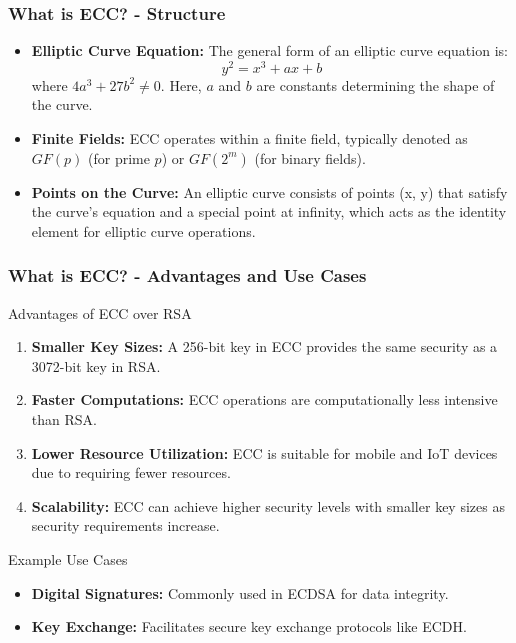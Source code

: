 \documentclass{beamer}
\begin{document}
\begin{frame}[fragile]
    \frametitle{What is ECC? - Structure}
    \begin{itemize}
        \item \textbf{Elliptic Curve Equation:} The general form of an elliptic curve equation is:
        \[
        y^2 = x^3 + ax + b
        \]
        where \(4a^3 + 27b^2 \neq 0\). Here, \(a\) and \(b\) are constants determining the shape of the curve.
        
        \item \textbf{Finite Fields:} ECC operates within a finite field, typically denoted as \(GF(p)\) (for prime \(p\)) or \(GF(2^m)\) (for binary fields).
        
        \item \textbf{Points on the Curve:} An elliptic curve consists of points (x, y) that satisfy the curve's equation and a special point at infinity, which acts as the identity element for elliptic curve operations.
    \end{itemize}
\end{frame}

\begin{frame}[fragile]
    \frametitle{What is ECC? - Advantages and Use Cases}
    \begin{block}{Advantages of ECC over RSA}
        \begin{enumerate}
            \item \textbf{Smaller Key Sizes:} A 256-bit key in ECC provides the same security as a 3072-bit key in RSA.
            \item \textbf{Faster Computations:} ECC operations are computationally less intensive than RSA.
            \item \textbf{Lower Resource Utilization:} ECC is suitable for mobile and IoT devices due to requiring fewer resources.
            \item \textbf{Scalability:} ECC can achieve higher security levels with smaller key sizes as security requirements increase.
        \end{enumerate}
    \end{block}
    
    \begin{block}{Example Use Cases}
        \begin{itemize}
            \item \textbf{Digital Signatures:} Commonly used in ECDSA for data integrity.
            \item \textbf{Key Exchange:} Facilitates secure key exchange protocols like ECDH.
        \end{itemize}
    \end{block}
\end{frame}
\end{document}
